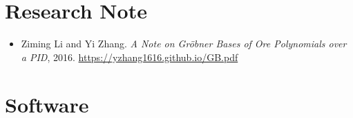 \documentclass[a4paper,12pt]{article}
\begin{document}
\section*{\Large{Research Note}}
\begin{itemize}
 \item Ziming Li and Yi Zhang. {\em A Note on Gr\"{o}bner Bases of Ore Polynomials over a PID}, 2016. 
 \url{https://yzhang1616.github.io/GB.pdf} 
\end{itemize}

\section*{\Large{Software}}
\end{document}
